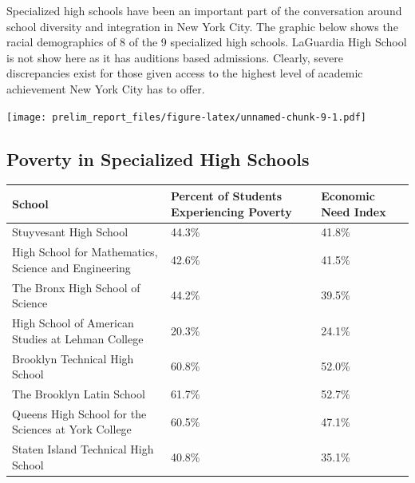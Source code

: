 \documentclass[11pt,]{article}
\begin{document}
Specialized high schools have been an important part of the conversation around school diversity and integration in New York City. The graphic below shows the racial demographics of 8 of the 9 specialized high schools. LaGuardia High School is not show here as it has auditions based admissions. Clearly, severe discrepancies exist for those given access to the highest level of academic achievement New York City has to offer.

\texttt{[image: prelim\_report\_files/figure-latex/unnamed-chunk-9-1.pdf]}

\hypertarget{poverty-in-specialized-high-schools}{%
\subsection{Poverty in Specialized High Schools}\label{poverty-in-specialized-high-schools}}
\begin{tabular}{l|l|l}
\hline
School & Percent of Students Experiencing Poverty & Economic Need Index\\
\hline
Stuyvesant High School & 44.3\% & 41.8\%\\
\hline
High School for Mathematics, Science and Engineering & 42.6\% & 41.5\%\\
\hline
The Bronx High School of Science & 44.2\% & 39.5\%\\
\hline
High School of American Studies at Lehman College & 20.3\% & 24.1\%\\
\hline
Brooklyn Technical High School & 60.8\% & 52.0\%\\
\hline
The Brooklyn Latin School & 61.7\% & 52.7\%\\
\hline
Queens High School for the Sciences at York College & 60.5\% & 47.1\%\\
\hline
Staten Island Technical High School & 40.8\% & 35.1\%\\
\hline
\end{tabular}
\end{document}
